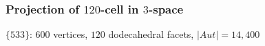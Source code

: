 \documentclass{beamer}
\begin{document}



\begin{frame}\frametitle{Projection of $120$-cell in $3$-space}
\vspace{-2mm}




\begin{center}
\begin{minipage}{8.5cm}
\centering
{}\par
\end{minipage}
\end{center}
\begin{center}
$\{533\}$: $600$ vertices, $120$ dodecahedral facets, $|Aut|=14,400$
\end{center}
\end{frame}
\end{document}

